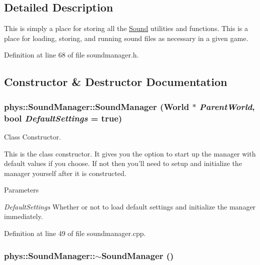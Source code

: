 \subsection{Detailed Description}
This is simply a place for storing all the \hyperlink{classphys_1_1Sound}{Sound} utilities and functions. This is a place for loading, storing, and running sound files as necessary in a given game. 

Definition at line 68 of file soundmanager.h.



\subsection{Constructor \& Destructor Documentation}
\hypertarget{classphys_1_1SoundManager_a134f60dd79d8049f37b076f63b5e7eaf}{
\subsubsection[{SoundManager}]{\setlength{\rightskip}{0pt plus 5cm}phys::SoundManager::SoundManager ({\bf World} $\ast$ {\em ParentWorld}, \/  bool {\em DefaultSettings} = {\ttfamily true})}}
\label{d1/dc4/classphys_1_1SoundManager_a134f60dd79d8049f37b076f63b5e7eaf}


Class Constructor. 

This is the class constructor. It gives you the option to start up the manager with default values if you choose. If not then you'll need to setup and initialize the manager yourself after it is constructed. 
\begin{DoxyParams}{Parameters}
\item[{\em DefaultSettings}]Whether or not to load default settings and initialize the manager immediately. \end{DoxyParams}


Definition at line 49 of file soundmanager.cpp.

\hypertarget{classphys_1_1SoundManager_af557110e5f0eccc7be861f163e1670d0}{
\subsubsection[{$\sim$SoundManager}]{\setlength{\rightskip}{0pt plus 5cm}phys::SoundManager::$\sim$SoundManager ()}}
\label{d1/dc4/classphys_1_1SoundManager_af557110e5f0eccc7be861f163e1670d0}


